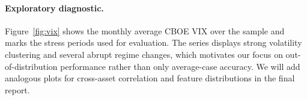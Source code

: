 \documentclass{article}
\begin{document}
\paragraph{Exploratory diagnostic.}
Figure~\ref{fig:vix} shows the monthly average CBOE VIX over the sample and marks the stress periods used for evaluation. The series displays strong volatility clustering and several abrupt regime changes, which motivates our focus on out-of-distribution performance rather than only average-case accuracy. We will add analogous plots for cross-asset correlation and feature distributions in the final report.

\begin{figure}[t]
  \centering
\end{figure}
\end{document}
